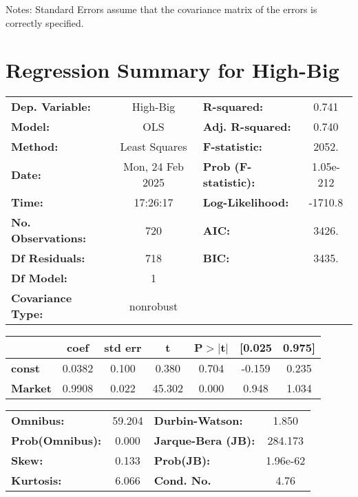 \documentclass{article}
\begin{document}
Notes: \newline
 [1] Standard Errors assume that the covariance matrix of the errors is correctly specified.
\newpage
\section*{Regression Summary for High-Big}
\begin{center}
\begin{tabular}{lclc}
\toprule
\textbf{Dep. Variable:}    &     High-Big     & \textbf{  R-squared:         } &     0.741   \\
\textbf{Model:}            &       OLS        & \textbf{  Adj. R-squared:    } &     0.740   \\
\textbf{Method:}           &  Least Squares   & \textbf{  F-statistic:       } &     2052.   \\
\textbf{Date:}             & Mon, 24 Feb 2025 & \textbf{  Prob (F-statistic):} & 1.05e-212   \\
\textbf{Time:}             &     17:26:17     & \textbf{  Log-Likelihood:    } &   -1710.8   \\
\textbf{No. Observations:} &         720      & \textbf{  AIC:               } &     3426.   \\
\textbf{Df Residuals:}     &         718      & \textbf{  BIC:               } &     3435.   \\
\textbf{Df Model:}         &           1      & \textbf{                     } &             \\
\textbf{Covariance Type:}  &    nonrobust     & \textbf{                     } &             \\
\bottomrule
\end{tabular}
\begin{tabular}{lcccccc}
                & \textbf{coef} & \textbf{std err} & \textbf{t} & \textbf{P$> |$t$|$} & \textbf{[0.025} & \textbf{0.975]}  \\
\midrule
\textbf{const}  &       0.0382  &        0.100     &     0.380  &         0.704        &       -0.159    &        0.235     \\
\textbf{Market} &       0.9908  &        0.022     &    45.302  &         0.000        &        0.948    &        1.034     \\
\bottomrule
\end{tabular}
\begin{tabular}{lclc}
\textbf{Omnibus:}       & 59.204 & \textbf{  Durbin-Watson:     } &    1.850  \\
\textbf{Prob(Omnibus):} &  0.000 & \textbf{  Jarque-Bera (JB):  } &  284.173  \\
\textbf{Skew:}          &  0.133 & \textbf{  Prob(JB):          } & 1.96e-62  \\
\textbf{Kurtosis:}      &  6.066 & \textbf{  Cond. No.          } &     4.76  \\
\bottomrule
\end{tabular}
\end{center}
\end{document}
